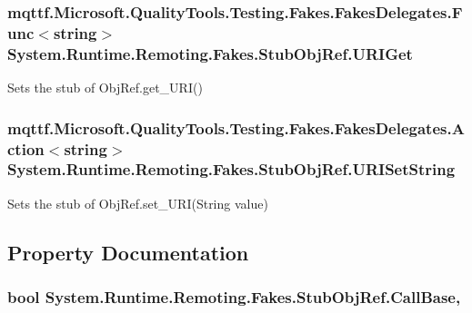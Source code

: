 \hypertarget{class_system_1_1_runtime_1_1_remoting_1_1_fakes_1_1_stub_obj_ref_a2237a91c553e20a7fa33fe5d8d0fe57d}{
\subsubsection[{U\-R\-I\-Get}]{\setlength{\rightskip}{0pt plus 5cm}mqttf.\-Microsoft.\-Quality\-Tools.\-Testing.\-Fakes.\-Fakes\-Delegates.\-Func$<$string$>$ System.\-Runtime.\-Remoting.\-Fakes.\-Stub\-Obj\-Ref.\-U\-R\-I\-Get}}\label{class_system_1_1_runtime_1_1_remoting_1_1_fakes_1_1_stub_obj_ref_a2237a91c553e20a7fa33fe5d8d0fe57d}


Sets the stub of Obj\-Ref.\-get\-\_\-\-U\-R\-I()

\hypertarget{class_system_1_1_runtime_1_1_remoting_1_1_fakes_1_1_stub_obj_ref_aba0de8f441817cfdabb0122361fe6571}{
\subsubsection[{U\-R\-I\-Set\-String}]{\setlength{\rightskip}{0pt plus 5cm}mqttf.\-Microsoft.\-Quality\-Tools.\-Testing.\-Fakes.\-Fakes\-Delegates.\-Action$<$string$>$ System.\-Runtime.\-Remoting.\-Fakes.\-Stub\-Obj\-Ref.\-U\-R\-I\-Set\-String}}\label{class_system_1_1_runtime_1_1_remoting_1_1_fakes_1_1_stub_obj_ref_aba0de8f441817cfdabb0122361fe6571}


Sets the stub of Obj\-Ref.\-set\-\_\-\-U\-R\-I(\-String value)



\subsection{Property Documentation}
\hypertarget{class_system_1_1_runtime_1_1_remoting_1_1_fakes_1_1_stub_obj_ref_a6d47298fbc67765d8c437e54abc67436}{
\subsubsection[{Call\-Base}]{\setlength{\rightskip}{0pt plus 5cm}bool System.\-Runtime.\-Remoting.\-Fakes.\-Stub\-Obj\-Ref.\-Call\-Base\hspace{0.3cm}{\ttfamily [get]}, {\ttfamily [set]}}}\label{class_system_1_1_runtime_1_1_remoting_1_1_fakes_1_1_stub_obj_ref_a6d47298fbc67765d8c437e54abc67436}


